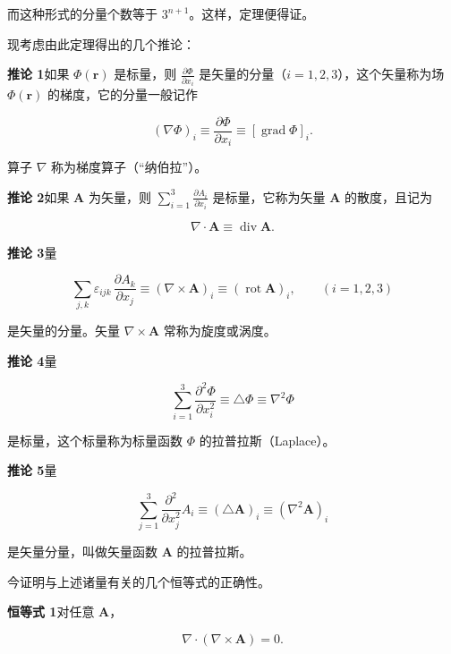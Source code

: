\documentclass[11pt,a4paper,oneside]{ctexbook}
\newcommand{\ve}[1]{\bm{#1}}
\begin{document}
而这种形式的分量个数等于 $3^{n+1}$。这样，定理便得证。

现考虑由此定理得出的几个推论：

\textbf{推论 1}\quad 如果 $\Phi(\ve{r})$ 是标量，则 $\frac{\partial\Phi}{\partial x_i}$ 是矢量的分量（$i = 1, 2, 3$），这个矢量称为场 $\Phi(\ve{r})$ 的梯度，它的分量一般记作

\begin{equation*}
(\nabla\Phi)_i \equiv \frac{\partial\Phi}{\partial x_i} \equiv [\operatorname{grad}\Phi]_i.
\end{equation*}

算子 $\nabla$ 称为梯度算子（“纳伯拉”）。

\textbf{推论 2}\quad 如果 $\ve{A}$ 为矢量，则 $\sum_{i=1}^{3} \frac{\partial A_i}{\partial x_i}$ 是标量，它称为矢量 $\ve{A}$ 的散度，且记为

\begin{equation*}
\nabla \cdot \ve{A} \equiv \operatorname{div}\ve{A}.
\end{equation*}

\textbf{推论 3}\quad 量

\begin{equation*}
\sum_{j,k} \varepsilon_{ijk}\, \frac{\partial A_k}{\partial x_j} \equiv (\nabla \times \ve{A})_i \equiv (\operatorname{rot}\ve{A})_i, \qquad (i = 1, 2, 3)
\end{equation*}

是矢量的分量。矢量 $\nabla \times \ve{A}$ 常称为旋度或涡度。

\textbf{推论 4}\quad 量

\begin{equation*}
\sum_{i=1}^{3} \frac{\partial^{2}\Phi}{\partial x_i^{2}} \equiv \triangle\Phi \equiv \nabla^{2}\Phi
\end{equation*}

是标量，这个标量称为标量函数 $\Phi$ 的拉普拉斯（Laplace）。

\textbf{推论 5}\quad 量

\begin{equation*}
\sum_{j=1}^{3} \frac{\partial^{2}}{\partial x_j^{2}} A_i \equiv (\triangle\ve{A})_i \equiv (\nabla^{2}\ve{A})_i
\end{equation*}

是矢量分量，叫做矢量函数 $\ve{A}$ 的拉普拉斯。

今证明与上述诸量有关的几个恒等式的正确性。

\textbf{恒等式 1}\quad 对任意 $\ve{A}$，

\begin{equation}
\nabla \cdot (\nabla \times \ve{A}) = 0.
\tag{1.31}
\end{equation}
\end{document}

